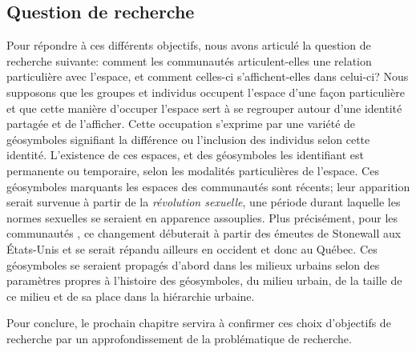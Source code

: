 \subsection*{Question de recherche} %
\label{sub:hypothese}
Pour répondre à ces différents objectifs, nous avons articulé la question de recherche suivante: comment les communautés \lgbt{} articulent-elles une relation particulière avec l'espace, et comment celles-ci s'affichent-elles dans celui-ci?
Nous supposons que les groupes et individus \lgbt{} occupent l'espace d'une façon particulière et que cette manière d'occuper l'espace sert à se regrouper autour d'une identité partagée et de l'afficher.
Cette occupation s'exprime par une variété de géosymboles signifiant la différence ou l'inclusion des individus selon cette identité.
L'existence de ces espaces, et des géosymboles les identifiant est permanente ou temporaire, selon les modalités particulières de l'espace.
Ces géosymboles marquants les espaces des communautés \lgbt{} sont récents; leur apparition serait survenue à partir de la \emph{révolution sexuelle}, une période durant laquelle les normes sexuelles se seraient en apparence assouplies.
Plus précisément, pour les communautés \lgbt{}, ce changement débuterait à partir des émeutes de Stonewall aux États-Unis et se serait répandu ailleurs en occident et donc au Québec.
Ces géosymboles se seraient propagés d'abord dans les milieux urbains selon des paramètres propres à l'histoire des géosymboles, du milieu urbain, de la taille de ce milieu et de sa place dans la hiérarchie urbaine.

Pour conclure, le prochain chapitre servira à confirmer ces choix d'objectifs de recherche par un approfondissement de la problématique de recherche.
